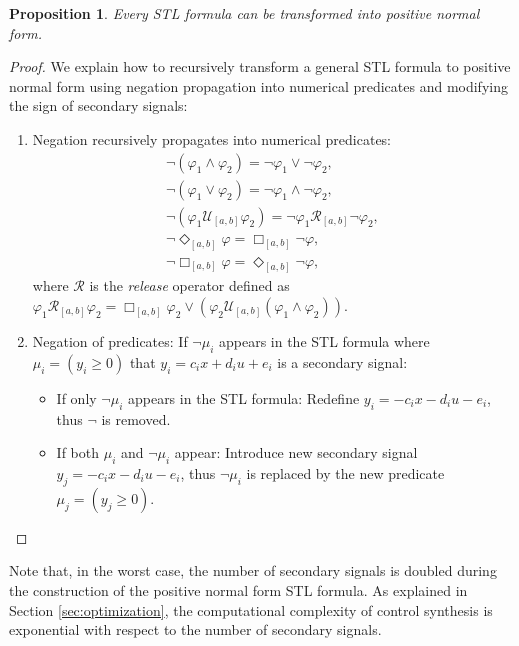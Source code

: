 \documentclass[letterpaper, 10 pt, conference]{ieeeconf}
\newtheorem{proposition}{Proposition}
\begin{document}
\begin{proposition}
Every STL formula can be transformed into positive normal form. 
\end{proposition}
\begin{proof}
We explain how to recursively transform a general STL formula to positive normal form using negation propagation into numerical predicates and modifying the sign of secondary signals:
 \begin{enumerate}
\item Negation recursively  propagates into numerical predicates:
\begin{equation*}
\begin{array}{l} 
\neg (\varphi_1 \wedge \varphi_2) = \neg \varphi_1 \vee \neg\varphi_2,
\\
\neg (\varphi_1 \vee \varphi_2) = \neg \varphi_1 \wedge \neg\varphi_2, \\
\neg (\varphi_1 \mathcal{U}_{[a,b]} \varphi_2) = \neg\varphi_1 \mathcal{R}_{[a,b]} \neg\varphi_2, \\ 
\neg \Diamond_{[a,b]} \varphi = \Box_{[a,b]} \neg\varphi, \\
\neg \Box_{[a,b]} \varphi= \Diamond_{[a,b]} \neg\varphi,
\end{array}
\end{equation*}
where $\mathcal{R}$ is the \emph{release} operator defined as $\varphi_1 \mathcal{R}_{[a,b]} \varphi_2=\Box_{[a,b]} \varphi_2 \vee (\varphi_2 \mathcal{U}_{[a,b]} (\varphi_1\wedge \varphi_2))$.
\item Negation of predicates: If $\neg \mu_i$ appears in the STL formula where $\mu_i=(y_i\ge 0)$ that $y_i=c_i x+d_i u+e_i$ is a secondary signal: 
\begin{itemize}
\item If only $\neg \mu_i$ appears in the STL formula: Redefine $y_i=-c_i x-d_i u-e_i$, thus $\neg$ is removed. 
\item If both $\mu_i$ and $\neg \mu_i$ appear: Introduce new secondary signal $y_{j}=-c_i x-d_i u - e_i$, thus $\neg \mu_i$ is replaced by the new predicate $\mu_j=(y_j \geq 0)$.
\end{itemize} 
\end{enumerate}
\end{proof}
Note that, in the worst case, the number of secondary signals is doubled during the construction of the positive normal form STL formula. As explained in Section \ref{sec:optimization}, the computational complexity of control synthesis is exponential with respect to the number of secondary signals. 
\end{document}
